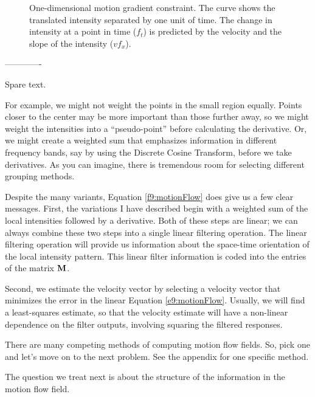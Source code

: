 \begin{figure}
\centerline{
}
\caption[Gradient Constraint]{
One-dimensional motion gradient constraint.
The curve shows the translated intensity separated
by one unit of time.
The change in intensity at a point in time
($f_t$) is predicted by the velocity
and the slope of the intensity ($v f_x$).
}
\label{f9:gradConstraint}
\end{figure}


-------------

Spare text.


For example, we might not
weight the points in the small region equally.
Points closer to the center may be more important than
those further away, so we might weight
the intensities into a ``pseudo-point''
before calculating the derivative.
Or, we might create a weighted sum
that emphasizes information in different frequency bands,
say by using the Discrete Cosine Transform,
before we take derivatives.
As you can imagine, there is tremendous room for
selecting different grouping methods.

Despite the many variants,
Equation \ref{f9:motionFlow} does give us a few clear messages.
First, the variations I have described begin with a weighted
sum of the local intensities followed by a derivative.
Both of these steps are linear; we can always combine these
two steps into a single linear filtering operation.
The linear filtering operation will provide us information
about the space-time orientation of the local intensity pattern.
This linear filter information 
is coded into the entries of the matrix $\bf M$.

Second, we estimate the velocity vector
by selecting a velocity vector
that minimizes the error in the linear Equation \ref{e9:motionFlow}.
Usually, we will find a least-squares estimate,
so that the velocity estimate will
have a non-linear dependence on the filter outputs,
involving squaring the filtered responses.

There are many competing methods of computing motion flow fields.
So, pick one and let's move on to the next problem.
See the appendix for one specific method.

The question we treat next is about the structure
of the information in the motion flow field.

